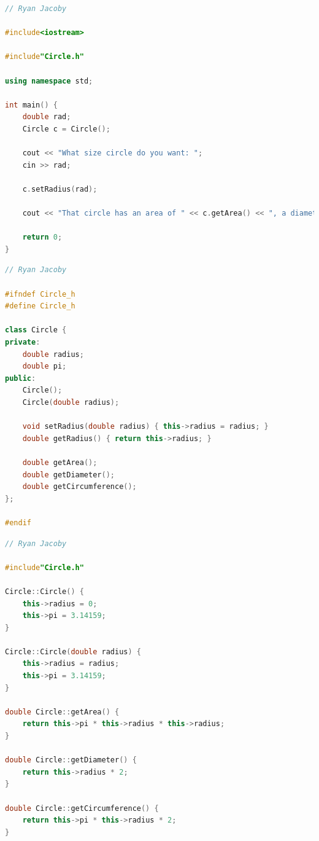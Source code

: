 \documentclass[letterpaper, 11pt]{article}
\begin{document}
\begin{lstlisting}[language=C++, caption=main.cpp]
// Ryan Jacoby

#include<iostream>

#include"Circle.h"

using namespace std;

int main() {
    double rad;
    Circle c = Circle();

    cout << "What size circle do you want: ";
    cin >> rad;
    
    c.setRadius(rad);

    cout << "That circle has an area of " << c.getArea() << ", a diameter of " << c.getDiameter() << ", and a circumference of " << c.getCircumference() << ".\n";

    return 0;
}
\end{lstlisting}

\begin{lstlisting}[language=C++, caption=Circle.h]
// Ryan Jacoby

#ifndef Circle_h
#define Circle_h

class Circle {
private:
    double radius;
    double pi;
public:
    Circle();
    Circle(double radius);

    void setRadius(double radius) { this->radius = radius; }
    double getRadius() { return this->radius; }
    
    double getArea();
    double getDiameter();
    double getCircumference();
};

#endif
\end{lstlisting}

\begin{lstlisting}[language=C++, caption=CircleImp.cpp]
// Ryan Jacoby

#include"Circle.h"

Circle::Circle() {
    this->radius = 0;
    this->pi = 3.14159;
}

Circle::Circle(double radius) {
    this->radius = radius;
    this->pi = 3.14159;
}

double Circle::getArea() {
    return this->pi * this->radius * this->radius;
}

double Circle::getDiameter() {
    return this->radius * 2;
}

double Circle::getCircumference() {
    return this->pi * this->radius * 2;
}
\end{lstlisting}
\end{document}
